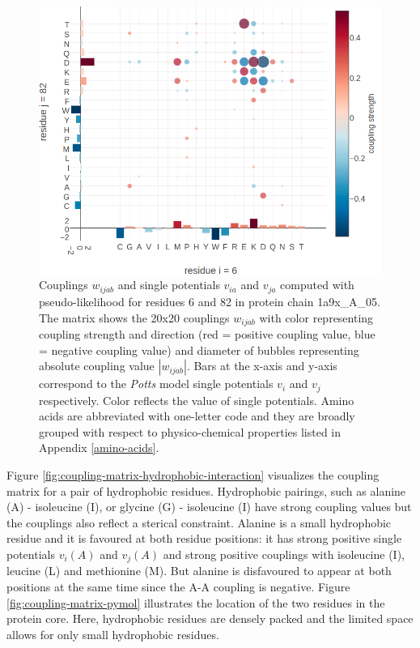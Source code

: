 \documentclass[11pt,a4paper,twoside]{book}
\newcommand{\vi}{v_{i}}
\newcommand{\vj}{v_{j}}
\newcommand{\via}{v_{ia}}
\newcommand{\vja}{v_{ja}}
\newcommand{\wijab}{w_{ijab}}
\theoremstyle{definition}
\theoremstyle{definition}
\theoremstyle{remark}
\begin{document}
\begin{figure}
\includegraphics[width=1\linewidth]{img/coupling_matrix_analysis/coupling_matrix_1a9xA05_6_82_notitle} \caption{Couplings \(\wijab\) and
single potentials \(\via\) and \(\vja\) computed with pseudo-likelihood
for residues 6 and 82 in protein chain 1a9x\_A\_05. The matrix shows the
20x20 couplings \(\wijab\) with color representing coupling strength and
direction (red = positive coupling value, blue = negative coupling
value) and diameter of bubbles representing absolute coupling value
\(|\wijab|\). Bars at the x-axis and y-axis correspond to the
\emph{Potts} model single potentials \(\vi\) and \(\vj\) respectively.
Color reflects the value of single potentials. Amino acids are
abbreviated with one-letter code and they are broadly grouped with
respect to physico-chemical properties listed in Appendix
\ref{amino-acids}.}\label{fig:coupling-matrix-ionic-interaction}
\end{figure}

Figure \ref{fig:coupling-matrix-hydrophobic-interaction} visualizes the
coupling matrix for a pair of hydrophobic residues. Hydrophobic
pairings, such as alanine (A) - isoleucine (I), or glycine (G) -
isoleucine (I) have strong coupling values but the couplings also
reflect a sterical constraint. Alanine is a small hydrophobic residue
and it is favoured at both residue positions: it has strong positive
single potentials \(\vi(A)\) and \(\vj(A)\) and strong positive
couplings with isoleucine (I), leucine (L) and methionine (M). But
alanine is disfavoured to appear at both positions at the same time
since the A-A coupling is negative. Figure
\ref{fig:coupling-matrix-pymol} illustrates the location of the two
residues in the protein core. Here, hydrophobic residues are densely
packed and the limited space allows for only small hydrophobic residues.
\end{document}
